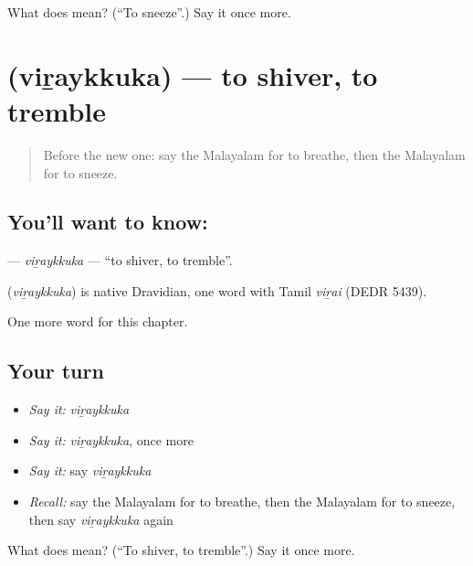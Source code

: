 \begin{tcolorbox}[breakable,colback=teal!4,colframe=teal!35!black,title={Before you move on}]
What does  mean? (\textquotedblleft{}To sneeze\textquotedblright{}.) Say it once more.
\end{tcolorbox}
\section[\texorpdfstring{\ml{വിറയ്ക്കുക} (viṟaykkuka)}{വിറയ്ക്കുക (viṟaykkuka)}]{ (viṟaykkuka) — to shiver, to tremble}

\label{lesson:ML-C304-viraykkuka}



\begin{quote}
Before the new one: say the Malayalam for to breathe, then the Malayalam for to sneeze.
\end{quote}

\subsection*{You'll want to know: }
\textbf{} — \emph{viṟaykkuka} — \textquotedblleft{}to shiver, to tremble\textquotedblright{}.

\begin{cousinweb}
\textbf{} (\emph{viṟaykkuka}) is native Dravidian, one word with Tamil \emph{viṟai} (DEDR 5439).
\end{cousinweb}

\begin{grammarlens}[title={What you've built}]
One more word for this chapter.
\end{grammarlens}

\subsection*{Your turn}
\begin{itemize}
\raggedright
  \item \emph{Say it:} \emph{viṟaykkuka}
  \item \emph{Say it:} \emph{viṟaykkuka}, once more
  \item \emph{Say it:} say \emph{viṟaykkuka}
  \item \emph{Recall:} say the Malayalam for to breathe, then the Malayalam for to sneeze, then say \emph{viṟaykkuka} again
\end{itemize}

\begin{tcolorbox}[breakable,colback=teal!4,colframe=teal!35!black,title={Before you move on}]
What does  mean? (\textquotedblleft{}To shiver, to tremble\textquotedblright{}.) Say it once more.
\end{tcolorbox}
